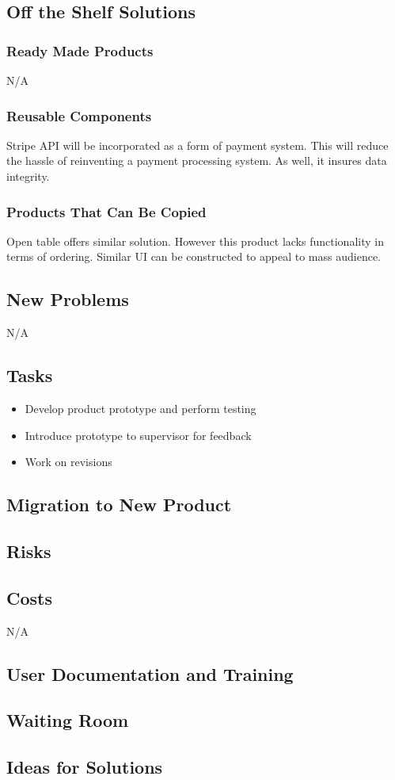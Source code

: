 \documentclass[12pt, titlepage]{article}
\begin{document}
\subsection{Off the Shelf Solutions}
\subsubsection{Ready Made Products}
N/A
\subsubsection{Reusable Components}
Stripe API will be incorporated as a form of payment system. This will reduce the hassle of reinventing a payment processing system. As well, it insures data integrity.
 \subsubsection{Products That Can Be Copied} 
Open table offers similar solution. However this product lacks functionality in terms of ordering. Similar UI can be constructed to appeal to mass audience.  
\subsection{New Problems}
N/A
\subsection{Tasks}
\begin{itemize}
  \item Develop product prototype and perform testing 
  \item Introduce prototype to supervisor for feedback
  \item 	Work on revisions
\end{itemize}
\subsection{Migration to New Product}

\subsection{Risks}
\subsection{Costs}
N/A
\subsection{User Documentation and Training}
\subsection{Waiting Room}
\subsection{Ideas for Solutions}
\end{document}

